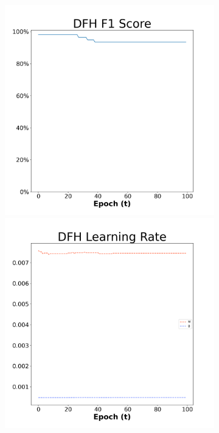 \begin{figure}[H]
    \centering %
\begin{subfigure}{0.3\textwidth}
  \includegraphics[width=\linewidth]{images/exper2/breast/DFH_0.01_f1.png}
    \includegraphics[width=\linewidth]{images/exper2/breast/DFH_0.01_lr.png}

\end{subfigure}
\end{figure}

